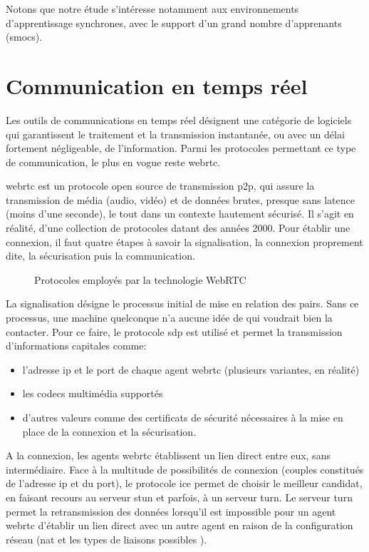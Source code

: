 Notons que notre étude s'intéresse notamment aux environnements d’apprentissage synchrones, 
avec le support d’un grand nombre d’apprenants (\acrshort{smoc}s).

\section{Communication en temps réel}
Les outils de communications en temps réel désignent une catégorie de logiciels qui garantissent le traitement et la transmission instantanée, 
ou avec un délai fortement négligeable,  de l’information. 
Parmi les protocoles permettant ce type de communication, le plus en vogue reste \acrfull{webrtc}.


\acrshort{webrtc} est un protocole open source de transmission \gls{p2p}, qui assure la transmission de média (audio, vidéo) 
et de données brutes, presque sans latence (moins d’une seconde), 
le tout dans un contexte hautement sécurisé. 
Il s’agit en réalité, d’une collection de protocoles datant des années 2000. 
Pour établir une connexion, il faut quatre étapes à savoir la signalisation, la connexion proprement dite, la sécurisation puis la communication.

\newpage
\begin{figure}[h]
  \centering
  \caption{Protocoles employés par la technologie WebRTC}
  \label{fig:webrtc_protocols}
\end{figure}

La signalisation désigne le processus initial de mise en relation des pairs. 
Sans ce processus, une machine quelconque n’a aucune idée de qui voudrait bien la contacter. 
Pour ce faire, le protocole \acrshort{sdp} est utilisé et permet la transmission d’informations capitales comme:

\begin{itemize}
  \item l’adresse \acrshort{ip} et le port de chaque agent \acrshort{webrtc} (plusieurs variantes, en réalité)
  \item les codecs multimédia supportés
  \item d’autres valeurs comme des certificats de sécurité nécessaires à la mise en place de la connexion et la sécurisation.
\end{itemize}


A la connexion, les agents \acrshort{webrtc} établissent un lien direct entre eux, sans intermédiaire. 
Face à la multitude de possibilités de connexion (couples constitués de l’adresse \acrshort{ip} et du port), 
le protocole \acrshort{ice} permet de choisir le meilleur candidat, en faisant recours au serveur \acrshort{stun} et parfois, à un serveur \acrshort{turn}. 
Le serveur \acrshort{turn} permet la retransmission des données lorsqu’il est impossible pour un agent \acrshort{webrtc} d'établir un lien 
direct avec un autre agent en raison de la configuration réseau (\acrshort{nat} et les types de liaisons possibles \cite{nat_links}).

